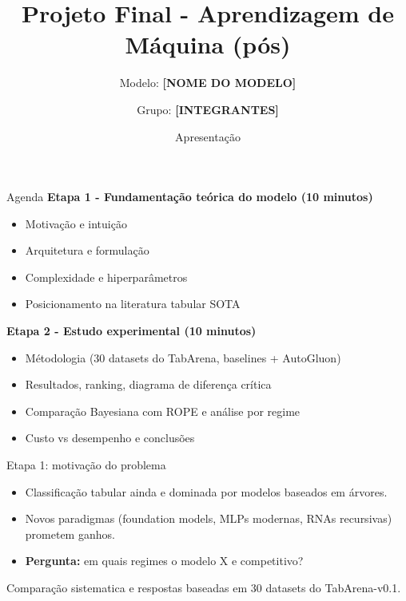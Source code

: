 \documentclass[aspectratio=169,11pt]{beamer}
\title{Projeto Final - Aprendizagem de Máquina (pós)}
\subtitle{Modelo: \textbf{[NOME DO MODELO]}}
\author{Grupo: \textbf{[INTEGRANTES]}}
\institute{2026.1}
\date{Apresentação}
\begin{document}
\begin{frame}
    \titlepage
\end{frame}

\begin{frame}{Agenda}
    \textbf{Etapa 1 - Fundamentação teórica do modelo (10 minutos)}
    \begin{itemize}
        \item Motivação e intuição
        \item Arquitetura e formulação
        \item Complexidade e hiperparâmetros
        \item Posicionamento na literatura tabular SOTA
    \end{itemize}
    \textbf{Etapa 2 - Estudo experimental (10 minutos)}
    \begin{itemize}
        \item Métodologia (30 datasets do TabArena, baselines + AutoGluon)
        \item Resultados, ranking, diagrama de diferença crítica
        \item Comparação Bayesiana com ROPE e análise por regime
        \item Custo vs desempenho e conclusões
    \end{itemize}
\end{frame}


\begin{frame}{Etapa 1: motivação do problema}
    \begin{itemize}
        \item Classificação tabular ainda e dominada por modelos baseados em árvores.
        \item Novos paradigmas (foundation models, MLPs modernas, RNAs recursivas) prometem ganhos.
        \item \textbf{Pergunta:} em quais regimes o modelo X e competitivo?
    \end{itemize}
    \vspace{0.4em}
    \footnotesize Comparação sistematica e respostas baseadas em 30 datasets do TabArena-v0.1.
\end{frame}
\end{document}
